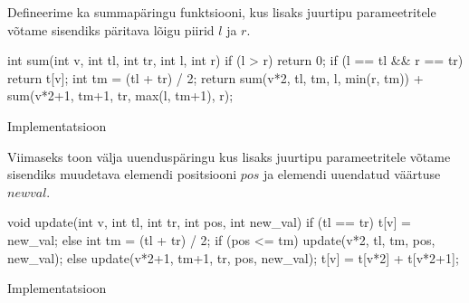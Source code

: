 \documentclass{trkut}
\begin{document}
Defineerime ka summapäringu funktsiooni, kus lisaks juurtipu parameetritele võtame sisendiks päritava lõigu piirid $l$ ja $r$.
\begin{cclol}
int sum(int v, int tl, int tr, int l, int r) {
    if (l > r) 
        return 0;
    if (l == tl && r == tr) {
        return t[v];
    }
    int tm = (tl + tr) / 2;
    return sum(v*2, tl, tm, l, min(r, tm))
           + sum(v*2+1, tm+1, tr, max(l, tm+1), r);
}
\end{cclol}
 \begin{kk}[H]%
    \caption{Implementatsioon}%
    \label{EMaxx}%
    \end{kk}
Viimaseks toon välja uuenduspäringu kus lisaks juurtipu parameetritele võtame sisendiks muudetava elemendi positsiooni $pos$ ja elemendi uuendatud väärtuse $new$\textunderscore$val$.
\begin{cclol}
void update(int v, int tl, int tr, int pos, int new_val) {
    if (tl == tr) {
        t[v] = new_val;
    } else {
        int tm = (tl + tr) / 2;
        if (pos <= tm)
            update(v*2, tl, tm, pos, new_val);
        else
            update(v*2+1, tm+1, tr, pos, new_val);
        t[v] = t[v*2] + t[v*2+1];
    }
}
\end{cclol}
 \begin{kk}[H]%
    \caption{Implementatsioon}%
    \label{EMaxx}%
    \end{kk}
\end{document}
